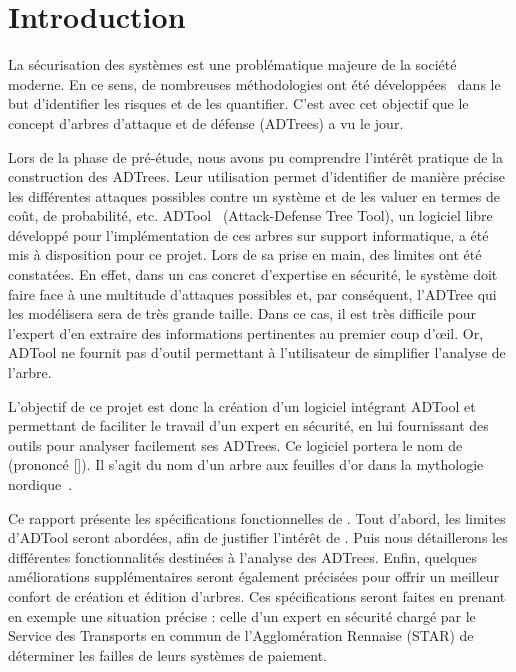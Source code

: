 \section{Introduction}
	La sécurisation des systèmes est une problématique majeure de la société moderne. En ce sens, de nombreuses méthodologies ont été développées~\cite{introSecurite,ADTreeKordy} dans le but d'identifier les risques et de les quantifier. C'est avec cet objectif que le concept d'arbres d'attaque et de défense (ADTrees) a vu le jour.

	Lors de la phase de pré-étude, nous avons pu comprendre l’intérêt pratique de la construction des ADTrees. Leur utilisation permet d'identifier de manière précise les différentes attaques possibles contre un système et de les valuer en termes de coût, de probabilité, etc. ADTool~\cite{adtool_paper} (Attack-Defense Tree Tool), un logiciel libre développé pour l'implémentation de ces arbres sur support informatique, a été mis à disposition pour ce projet. Lors de sa prise en main, des limites ont été constatées. En effet, dans un cas concret d'expertise en sécurité, le système doit faire face à une multitude d'attaques possibles et, par conséquent, l'ADTree qui les modélisera sera de très grande taille. Dans ce cas, il est très difficile pour l'expert d'en extraire des informations pertinentes au premier coup d’œil. Or, ADTool ne fournit pas d'outil permettant à l'utilisateur de simplifier l'analyse de l'arbre. 

	L'objectif de ce projet est donc la création d'un logiciel intégrant ADTool et permettant de faciliter le travail d'un expert en sécurité, en lui fournissant des outils pour analyser facilement ses ADTrees. Ce logiciel portera le nom de \glasir{}  (prononcé []). Il s'agit du nom d'un arbre aux feuilles d'or dans la mythologie nordique~\cite{vikingCulture}.

	Ce rapport présente les spécifications fonctionnelles de \glasir{}. Tout d'abord, les limites d'ADTool seront abordées, afin de justifier l'intérêt de \glasir{}. Puis nous détaillerons les différentes fonctionnalités destinées à l'analyse des ADTrees. Enfin, quelques améliorations supplémentaires seront également précisées pour offrir un meilleur confort de création et édition d'arbres. Ces spécifications seront faites en prenant en exemple une situation précise : celle d'un expert en sécurité chargé par le Service des Transports en commun de l'Agglomération Rennaise (STAR) de déterminer les failles de leurs systèmes de paiement.